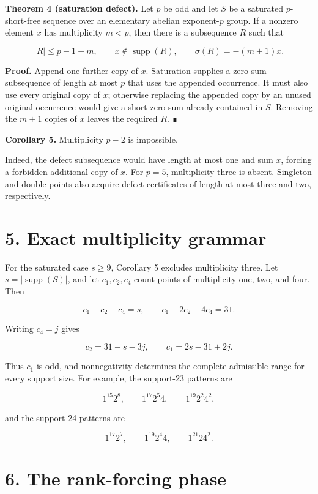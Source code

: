 \documentclass[
  11pt,
]{article}
\begin{document}
\textbf{Theorem 4 (saturation defect).} Let \(p\) be odd and let \(S\)
be a saturated \(p\)-short-free sequence over an elementary abelian
exponent-\(p\) group. If a nonzero element \(x\) has multiplicity
\(m<p\), then there is a subsequence \(R\) such that

\[
|R|\le p-1-m,
\qquad x\notin\operatorname{supp}(R),
\qquad \sigma(R)=-(m+1)x.
\]

\textbf{Proof.} Append one further copy of \(x\). Saturation supplies a
zero-sum subsequence of length at most \(p\) that uses the appended
occurrence. It must also use every original copy of \(x\); otherwise
replacing the appended copy by an unused original occurrence would give
a short zero sum already contained in \(S\). Removing the \(m+1\) copies
of \(x\) leaves the required \(R\). ∎

\textbf{Corollary 5.} Multiplicity \(p-2\) is impossible.

Indeed, the defect subsequence would have length at most one and sum
\(x\), forcing a forbidden additional copy of \(x\). For \(p=5\),
multiplicity three is absent. Singleton and double points also acquire
defect certificates of length at most three and two, respectively.

\hypertarget{exact-multiplicity-grammar}{%
\section{5. Exact multiplicity
grammar}\label{exact-multiplicity-grammar}}

For the saturated case \(s\ge9\), Corollary 5 excludes multiplicity
three. Let \(s=|\operatorname{supp}(S)|\), and let \(c_1, c_2, c_4\)
count points of multiplicity one, two, and four. Then

\[
c_1+c_2+c_4=s,
\qquad
c_1+2c_2+4c_4=31.
\]

Writing \(c_4=j\) gives

\[
c_2=31-s-3j,
\qquad
c_1=2s-31+2j.
\]

Thus \(c_1\) is odd, and nonnegativity determines the complete
admissible range for every support size. For example, the support-23
patterns are

\[
1^{15}2^8, \qquad 1^{17}2^5 4, \qquad 1^{19}2^2 4^2,
\]

and the support-24 patterns are

\[
1^{17}2^7, \qquad 1^{19}2^4 4, \qquad 1^{21}2 4^2.
\]

\hypertarget{the-rank-forcing-phase}{%
\section{6. The rank-forcing phase}\label{the-rank-forcing-phase}}
\end{document}
